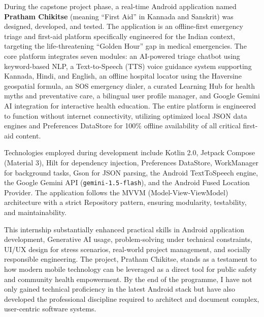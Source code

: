 \documentclass[12pt,a4paper]{report}
\begin{document}
\vspace{0.4cm}

During the capstone project phase, a real-time Android application named \textbf{Pratham Chikitse} (meaning ``First Aid'' in Kannada and Sanskrit) was designed, developed, and tested. The application is an offline-first emergency triage and first-aid platform specifically engineered for the Indian context, targeting the life-threatening ``Golden Hour'' gap in medical emergencies. The core platform integrates seven modules: an AI-powered triage chatbot using keyword-based NLP, a Text-to-Speech (TTS) voice guidance system supporting Kannada, Hindi, and English, an offline hospital locator using the Haversine geospatial formula, an SOS emergency dialer, a curated Learning Hub for health myths and preventative care, a bilingual user profile manager, and Google Gemini AI integration for interactive health education. The entire platform is engineered to function without internet connectivity, utilizing optimized local JSON data engines and Preferences DataStore for 100\% offline availability of all critical first-aid content.

\vspace{0.4cm}

Technologies employed during development include Kotlin 2.0, Jetpack Compose (Material 3), Hilt for dependency injection, Preferences DataStore, WorkManager for background tasks, Gson for JSON parsing, the Android TextToSpeech engine, the Google Gemini API (\texttt{gemini-1.5-flash}), and the Android Fused Location Provider. The application follows the MVVM (Model-View-ViewModel) architecture with a strict Repository pattern, ensuring modularity, testability, and maintainability.

\vspace{0.4cm}

This internship substantially enhanced practical skills in Android application development, Generative AI usage, problem-solving under technical constraints, UI/UX design for stress scenarios, real-world project management, and socially responsible engineering. The project, Pratham Chikitse, stands as a testament to how modern mobile technology can be leveraged as a direct tool for public safety and community health empowerment. By the end of the programme, I have not only gained technical proficiency in the latest Android stack but have also developed the professional discipline required to architect and document complex, user-centric software systems.

\newpage
\end{document}
